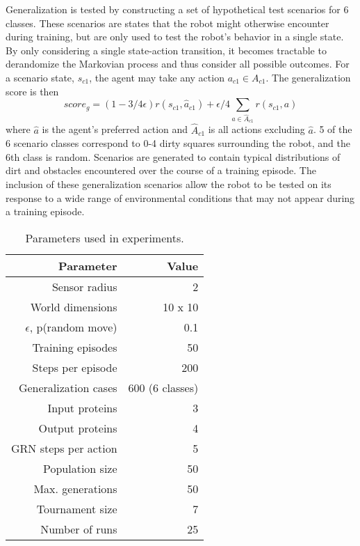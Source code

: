 \documentclass[conference]{IEEEtran}
\begin{document}
Generalization is tested by constructing a set of hypothetical test scenarios
for 6 classes. These scenarios are states that the robot might otherwise
encounter during training, but are only used to test the robot's behavior in a
single state. By only considering a single state-action transition, it becomes
tractable to derandomize the Markovian process and thus consider all possible
outcomes. For a scenario state, $s_{c1}$, the agent may take any action $a_{c1}
\in A_{c1}$. The generalization score is then
\begin{equation}
score_g = ( 1 - 3/4 \epsilon )r(s_{c1},\hat{a}_{c1}) + \epsilon / 4 \displaystyle\sum_{a \in \hat{A}_{c1}} r(s_{c1},a)
\end{equation}
\noindent where $\hat{a}$ is the agent's preferred action and $\hat{A}_{c1}$ is
all actions excluding $\hat{a}$. 5 of the 6 scenario classes correspond to 0-4
dirty squares surrounding the robot, and the 6th class is random. Scenarios are
generated to contain typical distributions of dirt and obstacles encountered
over the course of a training episode. The inclusion of these generalization
scenarios allow the robot to be tested on its response to a wide range of
environmental conditions that may not appear during a training episode.

\begin{table}
\centering
\begin{tabular}{|r|r|}
\hline
Parameter & Value \\
\hline
Sensor radius & 2 \\
World dimensions & 10 x 10 \\
$\epsilon$, p(random move) & 0.1 \\
Training episodes & 50 \\
Steps per episode & 200 \\
Generalization cases & 600 (6 classes) \\
\hline
Input proteins & 3 \\
Output proteins & 4 \\
GRN steps per action & 5 \\
Population size & 50 \\
Max. generations & 50 \\
Tournament size & 7 \\
Number of runs & 25 \\ 
\hline
\end{tabular}
\caption{Parameters used in experiments.}
\label{tbl:parameters}
\end{table}
\end{document}
